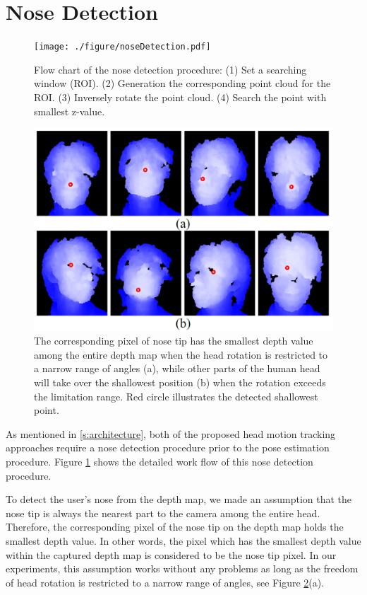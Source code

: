 \section{Nose Detection}
\label{s:nose detection}
\begin{figure}
\centering
\texttt{[image: ./figure/noseDetection.pdf]}
\caption{Flow chart of the nose detection procedure: (1) Set a searching window (ROI). (2) Generation the corresponding point cloud for the ROI. (3) Inversely rotate the point cloud. (4) Search the point with smallest z-value.}
\label{f:noseDetect}
\end{figure}

\begin{figure}
\centering
\includegraphics[width=0.7\linewidth]{./figure/nd_nearest.png}
\caption{The corresponding pixel of nose tip has the smallest depth value among the entire depth map when the head rotation is restricted to a narrow range of angles (a), while other parts of the human head will take over the shallowest position (b) when the rotation exceeds the limitation range. Red circle illustrates the detected shallowest point.}
\label{f:nd_nearest}       %
\end{figure}

As mentioned in \ref{s:architecture}, both of the proposed head motion tracking approaches require a nose detection procedure prior to the pose estimation procedure. Figure \ref{f:noseDetect} shows the detailed work flow of this nose detection procedure. 

To detect the user's nose from the depth map, we made an assumption that the nose tip is always the nearest part to the camera among the entire head. Therefore, the corresponding pixel of the nose tip on the depth map holds the smallest depth value. In other words, the pixel which has the smallest depth value within the captured depth map is considered to be the nose tip pixel. In our experiments, this assumption works without any problems as long as the freedom of head rotation is restricted to a narrow range of angles, see Figure \ref{f:nd_nearest}(a).

